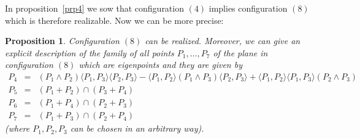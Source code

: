 \documentclass{amsart}
\theoremstyle{plain}
\newtheorem{prop}[theorem]{Proposition}
\theoremstyle{definition}
\newcommand{\scl}[2]{\langle #1, #2 \rangle}
\begin{document}
In proposition~\ref{prp4} we sow that configuration $(4)$ implies
configuration $(8)$ which is therefore realizable.
Now we can be more precise:

\begin{prop} Configuration $(8)$ can be realized. Moreover, we can give an
  explicit description of the family of all points $P_1, \dots, P_7$ of
  the plane in configuration $(8)$ which are eigenpoints and they are given
  by
  \[
  \begin{array}{rcl}
    P_4 &=& (P_1\wedge P_2)\scl{P_1}{P_3}\scl{P_2}{P_3}-
    \scl{P_1}{P_2}(P_1 \wedge P_3) \scl{P_2}{P_3}+
    \scl{P_1}{P_2}\scl{P_1}{P_3}(P_2 \wedge P_3)\\
    P_5 &=& (P_1+P_2) \cap (P_3+P_4) \\
    P_6 &=& (P_1+P_4) \cap (P_2+P_3) \\
    P_7 &=& (P_1+P_3) \cap (P_2+P_4) 
  \end{array}
  \]
  (where $P_1, P_2, P_3$ can be chosen in an arbitrary way). 
\end{prop}
\end{document}
